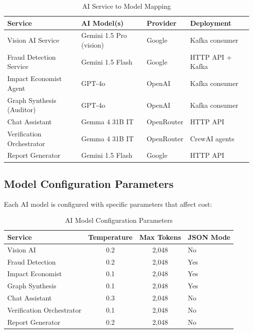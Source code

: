 \documentclass[11pt,a4paper]{article}
\begin{document}
\begin{table}[H]
\centering
\footnotesize
\begin{tabular}{|l|l|l|l|}
\hline
\textbf{Service} & \textbf{AI Model(s)} & \textbf{Provider} & \textbf{Deployment} \\
\hline
Vision AI Service & Gemini 1.5 Pro (vision) & Google & Kafka consumer \\
\hline
Fraud Detection Service & Gemini 1.5 Flash & Google & HTTP API + Kafka \\
\hline
Impact Economist Agent & GPT-4o & OpenAI & Kafka consumer \\
\hline
Graph Synthesis (Auditor) & GPT-4o & OpenAI & Kafka consumer \\
\hline
Chat Assistant & Gemma 4 31B IT & OpenRouter & HTTP API \\
\hline
Verification Orchestrator & Gemma 4 31B IT & OpenRouter & CrewAI agents \\
\hline
Report Generator & Gemini 1.5 Flash & Google & HTTP API \\
\hline
\end{tabular}
\caption{AI Service to Model Mapping}
\end{table}

\subsection{Model Configuration Parameters}

Each AI model is configured with specific parameters that affect cost:

\begin{table}[H]
\centering
\begin{tabular}{|l|c|c|l|}
\hline
\textbf{Service} & \textbf{Temperature} & \textbf{Max Tokens} & \textbf{JSON Mode} \\
\hline
Vision AI & 0.2 & 2,048 & No \\
\hline
Fraud Detection & 0.2 & 2,048 & Yes \\
\hline
Impact Economist & 0.1 & 2,048 & Yes \\
\hline
Graph Synthesis & 0.1 & 2,048 & Yes \\
\hline
Chat Assistant & 0.3 & 2,048 & No \\
\hline
Verification Orchestrator & 0.1 & 2,048 & No \\
\hline
Report Generator & 0.2 & 2,048 & No \\
\hline
\end{tabular}
\caption{AI Model Configuration Parameters}
\end{table}
\end{document}
